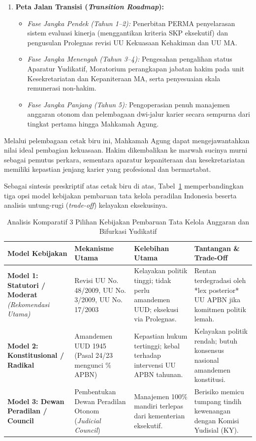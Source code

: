 \documentclass[12pt, a4paper]{article}
\begin{document}
\begin{enumerate}
    \item \textbf{Peta Jalan Transisi (\textit{Transition Roadmap}):}
    \begin{itemize}
        \item \textit{Fase Jangka Pendek (Tahun 1--2):} Penerbitan PERMA penyelarasan sistem evaluasi kinerja (menggantikan kriteria SKP eksekutif) dan pengusulan Prolegnas revisi UU Kekuasaan Kehakiman dan UU MA.
        \item \textit{Fase Jangka Menengah (Tahun 3--4):} Pengesahan pengalihan status Aparatur Yudikatif, Moratorium perangkapan jabatan hakim pada unit Kesekretariatan dan Kepaniteraan MA, serta penyesuaian skala remunerasi non-hakim.
        \item \textit{Fase Jangka Panjang (Tahun 5):} Pengoperasian penuh manajemen anggaran otonom dan pelembagaan dwi-jalur karier secara sempurna dari tingkat pertama hingga Mahkamah Agung.
    \end{itemize}
\end{enumerate}

Melalui pelembagaan cetak biru ini, Mahkamah Agung dapat mengejawantahkan nilai ideal pembagian kekuasaan. Hakim dikembalikan ke marwah sucinya murni sebagai pemutus perkara, sementara aparatur kepaniteraan dan kesekretariatan memiliki kepastian jenjang karier yang profesional dan bermartabat.

Sebagai sintesis preskriptif atas cetak biru di atas, Tabel~\ref{tab:pilihan-kebijakan} memperbandingkan tiga opsi model kebijakan pembaruan tata kelola peradilan Indonesia beserta analisis untung-rugi (\textit{trade-off}) kelayakan eksekusinya.

\begin{table}[H]
\centering
\fontsize{8.5}{10.5}\selectfont
\caption{Analisis Komparatif 3 Pilihan Kebijakan Pembaruan Tata Kelola Anggaran dan Bifurkasi Yudikatif}
\label{tab:pilihan-kebijakan}
\renewcommand{\arraystretch}{1.3}
\begin{tabular}{p{2.8cm} p{3.8cm} p{4.0cm} p{3.5cm}}
\hline
\textbf{Model Kebijakan} & \textbf{Mekanisme Utama} & \textbf{Kelebihan Utama} & \textbf{Tantangan \& Trade-Off} \\
\hline
\raggedright\textbf{Model 1: Statutori / Moderat} \newline \textit{(Rekomendasi Utama)} & Revisi UU No. 48/2009, UU No. 3/2009, UU No. 17/2003 & Kelayakan politik tinggi; tidak perlu amandemen UUD; eksekusi via Prolegnas. & Rentan terdegradasi oleh *lex posterior* UU APBN jika komitmen politik lemah. \\
\raggedright\textbf{Model 2: Konstitusional / Radikal} & Amandemen UUD 1945 (Pasal 24/23 mengunci \% APBN) & Kepastian hukum tertinggi; kebal terhadap intervensi UU APBN tahunan. & Kelayakan politik rendah; butuh konsensus nasional amandemen konstitusi. \\
\raggedright\textbf{Model 3: Dewan Peradilan / Council} & Pembentukan Dewan Peradilan Otonom (\textit{Judicial Council}) & Manajemen 100\% mandiri terlepas dari kementerian eksekutif. & Berisiko memicu tumpang tindih kewenangan dengan Komisi Yudisial (KY). \\
\hline
\end{tabular}
\end{table}
\end{document}

